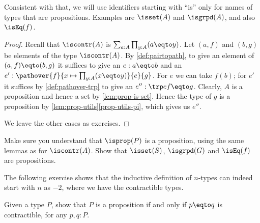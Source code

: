 Consistent with that, we will use identifiers starting with ``is'' only for names of types
that are propositions. Examples are $\isset(A)$ and $\isgrpd(A)$,
and also $\isEq(f)$.

\begin{proof}
Recall that $\iscontr(A)$ is $\sum_{a:A} \prod_{y:A} (a \eqto y)$.
Let $(a,f)$ and $(b,g)$ be elements of the type $\iscontr(A)$.
By \cref{def:pairtopath}, to give an element of $(a,f) \eqto (b,g)$ it suffices
to give an $e : a \eqto b$ and an $e' : \pathover{f}{x\mapsto\prod_{y:A} (x \eqto y)}{e}{g}$.
For $e$ we can take $f(b)$; for $e'$ it suffices by \cref{def:pathover-trp}
to give an $e'' : \trp e f \eqto g$. Clearly, $A$ is a proposition and hence
a set by \cref{lem:prop-is-set}. Hence the type of $g$ is a proposition
by \cref{lem:prop-utils}\ref{prop-utils-pi}, which gives us $e''$.

We leave the other cases as exercises.
\end{proof}

\begin{xca}\label{xca:isX-is-prop}
Make sure you understand that $\isprop(P)$ is a proposition,
using the same lemmas as for $\iscontr(A)$.
Show that $\isset(S)$, $\isgrpd(G)$ and $\isEq(f)$ are propositions.
\end{xca}

The following exercise shows that the inductive definition of $n$-types can
indeed start with $n$ as $-2$, where we have the contractible types.

\begin{xca}\label{xca:prop-contractible=}
Given a type $P$, show that $P$ is a proposition if and only if $p \eqto q$ is contractible,
for any $p, q: P$.
\end{xca}

